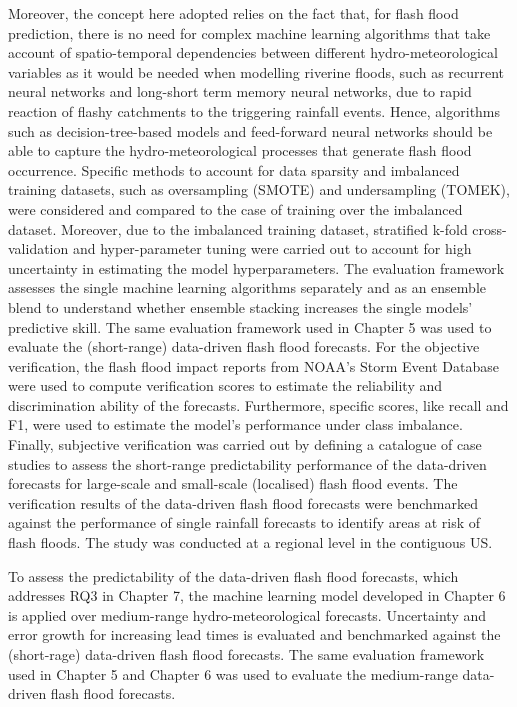 Moreover, the concept here adopted relies on the fact that, for flash flood prediction, there is no need for complex machine learning algorithms that take account of spatio-temporal dependencies between different hydro-meteorological variables as it would be needed when modelling riverine floods, such as recurrent neural networks and long-short term memory neural networks, due to rapid reaction of flashy catchments to the triggering rainfall events. Hence, algorithms such as decision-tree-based models and feed-forward neural networks should be able to capture the hydro-meteorological processes that generate flash flood occurrence. Specific methods to account for data sparsity and imbalanced training datasets, such as oversampling (SMOTE) and undersampling (TOMEK), were considered and compared to the case of training over the imbalanced dataset. Moreover, due to the imbalanced training dataset, stratified k-fold cross-validation and hyper-parameter tuning were carried out to account for high uncertainty in estimating the model hyperparameters. The evaluation framework assesses the single machine learning algorithms separately and as an ensemble blend to understand whether ensemble stacking increases the single models' predictive skill. The same evaluation framework used in Chapter 5 was used to evaluate the (short-range) data-driven flash flood forecasts. For the objective verification, the flash flood impact reports from NOAA's Storm Event Database were used to compute verification scores to estimate the reliability and discrimination ability of the forecasts. Furthermore, specific scores, like recall and F1, were used to estimate the model's performance under class imbalance. Finally, subjective verification was carried out by defining a catalogue of case studies to assess the short-range predictability performance of the data-driven forecasts for large-scale and small-scale (localised) flash flood events. The verification results of the data-driven flash flood forecasts were benchmarked against the performance of single rainfall forecasts to identify areas at risk of flash floods. The study was conducted at a regional level in the contiguous US.  

To assess the predictability of the data-driven flash flood forecasts, which addresses RQ3 in Chapter 7, the machine learning model developed in Chapter 6 is applied over medium-range hydro-meteorological forecasts. Uncertainty and error growth for increasing lead times is evaluated and benchmarked against the (short-rage) data-driven flash flood forecasts. The same evaluation framework used in Chapter 5 and Chapter 6 was used to evaluate the medium-range data-driven flash flood forecasts.


